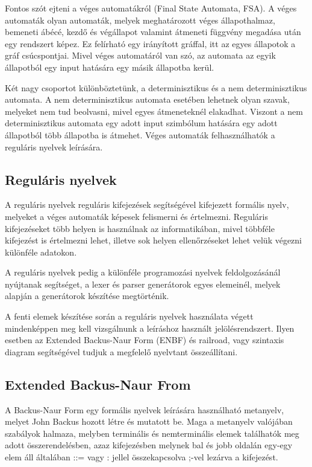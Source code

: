 Fontos szót ejteni a véges automatákról (Final State Automata, FSA). A véges automaták olyan automaták, melyek meghatározott véges állapothalmaz, bemeneti ábécé, kezdő és végállapot valamint átmeneti függvény megadása után egy rendszert képez. Ez felírható egy irányított gráffal, itt az egyes állapotok a gráf csúcspontjai. Mivel véges automatáról van szó, az automata az egyik állapotból egy input hatására egy másik állapotba kerül.

Két nagy csoportot különböztetünk, a determinisztikus és a nem determinisztikus automata. A nem determinisztikus automata esetében lehetnek olyan szavak, melyeket nem tud beolvasni, mivel egyes átmeneteknél elakadhat. Viszont a nem determinisztikus automata egy adott input szimbólum hatására egy adott állapotból több állapotba is átmehet. Véges automaták felhasználhatók a reguláris nyelvek leírására.


\subsection{Reguláris nyelvek}

A reguláris nyelvek reguláris kifejezések segítségével kifejezett formális nyelv, melyeket a véges automaták képesek felismerni és értelmezni. Reguláris kifejezéseket több helyen is használnak az informatikában, mivel többféle kifejezést is értelmezni lehet, illetve sok helyen ellenőrzéseket lehet velük végezni különféle adatokon.

A reguláris nyelvek pedig a különféle programozási nyelvek feldolgozásánál nyújtanak segítséget, a lexer és parser generátorok egyes elemeinél, melyek alapján a generátorok készítése megtörténik.

A fenti elemek készítése során a reguláris nyelvek használata végett mindenképpen meg kell vizsgálnunk a leíráshoz használt jelölésrendszert. Ilyen esetben az Extended Backus-Naur Form (ENBF) és railroad, vagy szintaxis diagram segítségével tudjuk a megfelelő nyelvtant összeállítani.

\subsection{Extended Backus-Naur From}

A Backus-Naur Form egy formális nyelvek leírására használható metanyelv, melyet John Backus hozott létre és mutatott be. Maga a metanyelv valójában szabályok halmaza, melyben terminális és nemterminális elemek találhatók meg adott összerendelésben, azaz kifejezésben melynek bal és jobb oldalán egy-egy elem áll általában ::= vagy : jellel összekapcsolva ;-vel lezárva a kifejezést.

